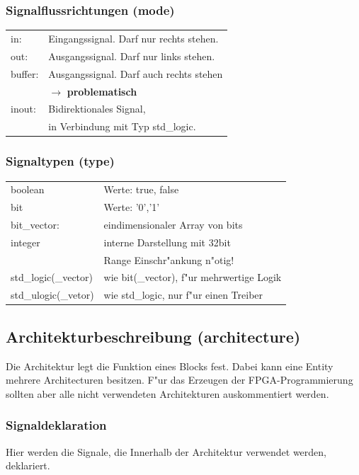 	\begin{multicols}{2}
	\subsubsection{Signalflussrichtungen (mode)}
		\begin{tabular}{ll}
			in: & Eingangssignal. Darf nur rechts stehen.\\
			out: & Ausgangssignal. Darf nur links stehen.\\
			buffer: & Ausgangssignal. Darf auch rechts stehen\\
			&  $\rightarrow$ \textbf{problematisch}\\
			inout: & Bidirektionales Signal, \\
			& in Verbindung mit Typ std\_logic.\\
		\end{tabular}
	\subsubsection{Signaltypen (type)}
		\begin{tabular}{ll}
			boolean & Werte: true, false\\
			bit & Werte: '0','1'\\
			bit\_vector: & eindimensionaler Array von bits\\
			integer & interne Darstellung mit 32bit\\
			& Range Einschr"ankung n"otig!\\
			std\_logic(\_vector) & wie bit(\_vector), f"ur mehrwertige Logik\\
			std\_ulogic(\_vetor) & wie std\_logic, nur f"ur einen Treiber\\
		\end{tabular}
	\end{multicols}
	
	\subsection{Architekturbeschreibung (architecture)}
		Die Architektur legt die Funktion eines Blocks fest. Dabei kann eine Entity mehrere 				Architecturen besitzen. F"ur das Erzeugen der FPGA-Programmierung sollten aber alle 
		nicht verwendeten Architekturen auskommentiert werden.
		

		\subsubsection{Signaldeklaration}
			 Hier werden die Signale, die Innerhalb der Architektur verwendet werden, 
			deklariert.
			\begin{multicols}{2}
				
			\end{multicols}
